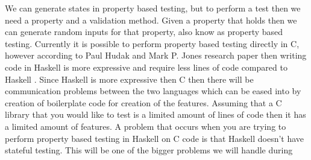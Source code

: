 We can generate states in property based testing, but to perform a test then we need a property and a validation method.
Given a property that holds then we can generate random inputs for that property, also know as property based testing.
Currently it is possible to perform property based testing directly in C,
however according to Paul Hudak and Mark P. Jones research paper then writing code in Haskell is more expressive and require less lines of code compared to Haskell \citep{HaskellVsWorld}.
Since Haskell is more expressive then C then there will be communication problems between the two languages which can be eased into by creation of boilerplate code for creation of the features.
Assuming that a C library that you would like to test is a limited amount of lines of code then it has a limited amount of features.
A problem that occurs when you are trying to perform property based testing in Haskell on C code is that Haskell doesn't have stateful testing.
This will be one of the bigger problems we will handle during







